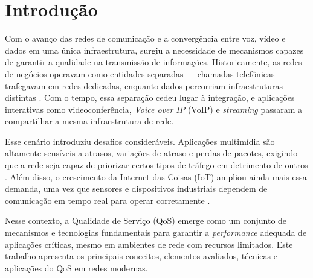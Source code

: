 \section{Introdução}
\label{sec:introducao}

Com o avanço das redes de comunicação e a convergência entre voz, vídeo e dados
em uma única infraestrutura, surgiu a necessidade de mecanismos capazes de
garantir a qualidade na transmissão de informações. Historicamente, as redes de
negócios operavam como entidades separadas — chamadas telefônicas trafegavam em
redes dedicadas, enquanto dados percorriam infraestruturas distintas
\cite{fortinet2024}. Com o tempo, essa separação cedeu lugar à integração, e
aplicações interativas como videoconferência, \textit{Voice over IP} (VoIP) e
\textit{streaming} passaram a compartilhar a mesma infraestrutura de rede.

Esse cenário introduziu desafios consideráveis. Aplicações multimídia são
altamente sensíveis a atrasos, variações de atraso e perdas de pacotes, exigindo
que a rede seja capaz de priorizar certos tipos de tráfego em detrimento de
outros \cite{techtarget2024}. Além disso, o crescimento da Internet das Coisas
(IoT) ampliou ainda mais essa demanda, uma vez que sensores e dispositivos
industriais dependem de comunicação em tempo real para operar corretamente
\cite{fortinet2024}.

Nesse contexto, a Qualidade de Serviço (QoS) emerge como um conjunto de
mecanismos e tecnologias fundamentais para garantir a \textit{performance}
adequada de aplicações críticas, mesmo em ambientes de rede com recursos
limitados. Este trabalho apresenta os principais conceitos, elementos avaliados,
técnicas e aplicações do QoS em redes modernas.
